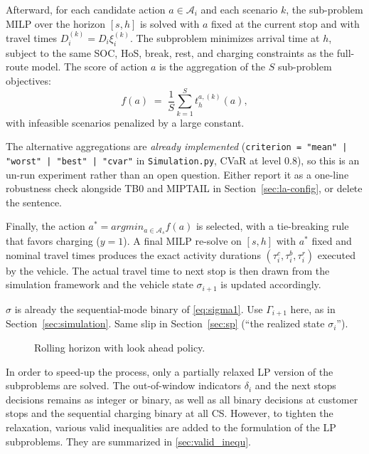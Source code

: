 Afterward, for each candidate action $a \in \mathcal{A}_i$ and each scenario $k$, the sub-problem MILP over the horizon $[s, h]$ is solved with $a$ fixed at the current stop and with travel times $D^{(k)}_i = D_i \xi^{(k)}_i$. The subproblem minimizes arrival time at $h$, subject to the same SOC, HoS, break, rest, and charging constraints as the full-route model. The score of action $a$ is the aggregation of the $S$ sub-problem objectives:
\[
  f(a) \;=\; \frac{1}{S}\sum_{k=1}^{S} t^{a,(k)}_h(a),
\]
with infeasible scenarios penalized by a large constant. 

\begin{acmt}
The alternative aggregations are \emph{already implemented}
(\texttt{criterion = "mean" | "worst" | "best" | "cvar"} in
\texttt{Simulation.py}, CVaR at level 0.8), so this is an un-run experiment
rather than an open question. Either report it as a one-line robustness check
alongside TB0 and MIPTAIL in Section~\ref{sec:la-config}, or delete the sentence.
\end{acmt}

Finally, the action $a^* = argmin_ {a \in \mathcal{A}_s} f(a)$ is selected, with a tie-breaking rule that favors charging ($y=1$). A final MILP re-solve on $[s, h]$ with $a^*$ fixed and nominal travel times produces the exact activity durations $(\tau^c_i, \tau^b_i, \tau^r_i)$ executed by the vehicle. The actual travel time to next stop is then drawn from the simulation framework and the vehicle state $\sigma_{i+1}$ is updated accordingly.

\begin{acmt}
$\sigma$ is already the sequential-mode binary of \eqref{eq:sigma1}. Use
$\Gamma_{i+1}$ here, as in Section~\ref{sec:simulation}. Same slip in
Section~\ref{sec:sp} (``the realized state $\sigma_i$'').
\end{acmt}

\begin{figure}[h!]
    \centering
    \caption{Rolling horizon with look ahead policy.}
    \label{fig:RH}
\end{figure}

In order to speed-up the process, only a partially relaxed LP version of the subproblems are solved. The out-of-window indicators $\delta_i$ and the next stops decisions remains as integer or binary, as well as all binary decisions at customer stops and the sequential charging binary at all CS. However, to tighten the relaxation, various valid inequalities are added to the formulation of the LP subproblems. They are summarized in \ref{sec:valid_inequ}.

